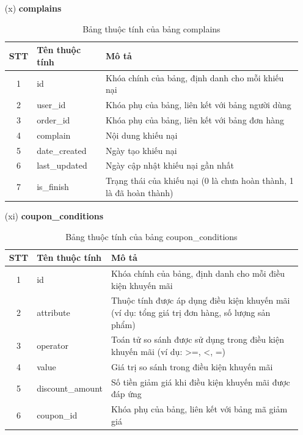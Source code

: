 \documentclass[../DoAn.tex]{subfiles}
\begin{document}
\begin{enumerate}
    \item[(x)] \textbf{complains}
    \begin{table}[H]
    \centering
        \begin{tabular}{|c|m{4cm}|m{8cm}|}
        \hline
        \textbf{STT} & \textbf{Tên thuộc tính} & \textbf{Mô tả} \\
        \hline
        1 & id & Khóa chính của bảng, định danh cho mỗi khiếu nại \\
        \hline
        2 & user\_id & Khóa phụ của bảng, liên kết với bảng người dùng \\
        \hline
        3 & order\_id & Khóa phụ của bảng, liên kết với bảng đơn hàng \\
        \hline
        4 & complain & Nội dung khiếu nại \\
        \hline
        5 & date\_created & Ngày tạo khiếu nại \\
        \hline
        6 & last\_updated & Ngày cập nhật khiếu nại gần nhất \\
        \hline
        7 & is\_finish & Trạng thái của khiếu nại (0 là chưa hoàn thành, 1 là đã hoàn thành) \\
        \hline
        \end{tabular}
        \caption{Bảng thuộc tính của bảng complains}
        \label{tab:complains_attributes}
    \end{table}
    
    \item[(xi)] \textbf{coupon\_conditions}
    \begin{table}[H]
    \centering
        \begin{tabular}{|c|m{4cm}|m{8cm}|}
        \hline
        \textbf{STT} & \textbf{Tên thuộc tính} & \textbf{Mô tả} \\
        \hline
        1 & id & Khóa chính của bảng, định danh cho mỗi điều kiện khuyến mãi \\
        \hline
        2 & attribute & Thuộc tính được áp dụng điều kiện khuyến mãi (ví dụ: tổng giá trị đơn hàng, số lượng sản phẩm) \\
        \hline
        3 & operator & Toán tử so sánh được sử dụng trong điều kiện khuyến mãi (ví dụ: >=, <, =) \\
        \hline
        4 & value & Giá trị so sánh trong điều kiện khuyến mãi \\
        \hline
        5 & discount\_amount & Số tiền giảm giá khi điều kiện khuyến mãi được đáp ứng \\
        \hline
        6 & coupon\_id & Khóa phụ của bảng, liên kết với bảng mã giảm giá \\
        \hline
        \end{tabular}
        \caption{Bảng thuộc tính của bảng coupon\_conditions}
        \label{tab:coupon_conditions_attributes}
    \end{table}


\end{enumerate}
\end{document}
